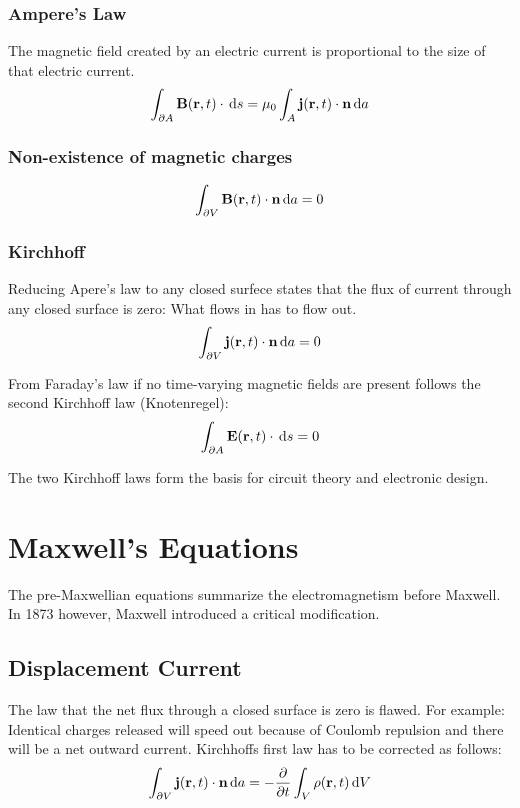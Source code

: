 \documentclass[a4paper, fontsize=8pt, landscape, DIV=1]{scrartcl}
\begin{document}
\begin{multicols*}{4}
  \subsubsection{Ampere's Law}
  The magnetic field created by an electric current is proportional to the size of that electric current.
  \[\int_{\partial A}\mathbf{B}(\mathbf{r},t)\cdot \,\mathrm{d} s = \mu_0 \int_A \mathbf{j}(\mathbf{r},t)\cdot \mathbf{n} \,\mathrm{d} a \]

  \subsubsection{Non-existence of magnetic charges}

  \[\int_{\partial V}\mathbf{B}(\mathbf{r},t)\cdot \mathbf{n} \,\mathrm{d} a = 0 \]
  
  \subsubsection{Kirchhoff}
  Reducing Apere's law to any closed surfece states that the flux of current through any closed surface is zero: What flows in has to flow out.
  \[ \int_{\partial V} \mathbf{j}(\mathbf{r},t) \cdot \mathbf{n}\,\mathrm{d} a = 0 \]

  From Faraday's law if no time-varying magnetic fields are present follows the second Kirchhoff law (Knotenregel):
  \[ \int_{\partial A} \mathbf{E}(\mathbf{r},t)\cdot \,\mathrm{d} s = 0 \]

  The two Kirchhoff laws form the basis for circuit theory and electronic design.

  \section{Maxwell's Equations}
  The pre-Maxwellian equations summarize the electromagnetism before Maxwell. In 1873 however, Maxwell introduced a critical modification.

  \subsection{Displacement Current}
  The law that the net flux through a closed surface is zero is flawed. For example: Identical charges released will speed out because of Coulomb repulsion and there will be a net outward current. Kirchhoffs first law has to be corrected as follows:
  \[\int_{\partial V} \mathbf{j}(\mathbf{r},t) \cdot \mathbf{n} \,\mathrm{d} a = -\frac{\partial}{\partial t} \int_V  \rho(\mathbf{r},t) \,\mathrm{d} V\]


\end{multicols*}
\end{document}
